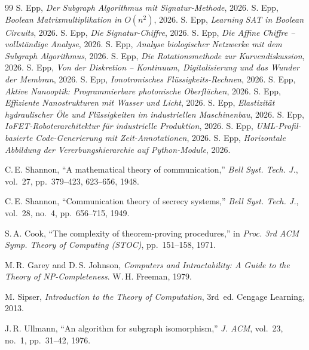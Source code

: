 ﻿\documentclass[a4paper,12pt]{scrreprt}
\theoremstyle{definition}
\begin{document}
\begingroup
\begin{thebibliography}{99}
  S. Epp, \textit{Der Subgraph Algorithmus mit Signatur-Methode}, 2026.
 S. Epp, \textit{Boolean Matrixmultiplikation in $O(n^2)$}, 2026.
 S. Epp, \textit{Learning SAT in Boolean Circuits}, 2026.
 S. Epp, \textit{Die Signatur-Chiffre}, 2026.
 S. Epp, \textit{Die Affine Chiffre -- vollständige Analyse}, 2026.
 S. Epp, \textit{Analyse biologischer Netzwerke mit dem Subgraph Algorithmus}, 2026.
 S. Epp, \textit{Die Rotationsmethode zur Kurvendiskussion}, 2026.
 S. Epp, \textit{Von der Diskretion -- Kontinuum, Digitalisierung und das Wunder der Membran}, 2026.
 S. Epp, \textit{Ionotronisches Flüssigkeits-Rechnen}, 2026.
 S. Epp, \textit{Aktive Nanooptik: Programmierbare photonische Oberflächen}, 2026.
 S. Epp, \textit{Effiziente Nanostrukturen mit Wasser und Licht}, 2026.
 S. Epp, \textit{Elastizität hydraulischer Öle und Flüssigkeiten im industriellen Maschinenbau}, 2026.
 S. Epp, \textit{IoFET-Roboterarchitektur für industrielle Produktion}, 2026.
 S. Epp, \textit{UML-Profil-basierte Code-Generierung mit Zeit-Annotationen}, 2026.
 S. Epp, \textit{Horizontale Abbildung der Vererbungshierarchie auf Python-Module}, 2026.

 C.\,E. Shannon, ``A mathematical theory of communication,''
  \textit{Bell Syst. Tech. J.}, vol.~27, pp.~379--423, 623--656, 1948.

 C.\,E. Shannon, ``Communication theory of secrecy systems,''
  \textit{Bell Syst. Tech. J.}, vol.~28, no.~4, pp.~656--715, 1949.

 S.\,A. Cook, ``The complexity of theorem-proving procedures,''
  in \textit{Proc. 3rd ACM Symp. Theory of Computing (STOC)}, pp.~151--158, 1971.

 M.\,R. Garey and D.\,S. Johnson,
  \textit{Computers and Intractability: A Guide to the Theory of NP-Completeness}.
  W.\,H. Freeman, 1979.

 M. Sipser,
  \textit{Introduction to the Theory of Computation}, 3rd~ed.
  Cengage Learning, 2013.

 J.\,R. Ullmann, ``An algorithm for subgraph isomorphism,''
  \textit{J. ACM}, vol.~23, no.~1, pp.~31--42, 1976.


\end{thebibliography}
\end{document}
